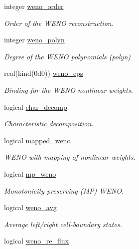 \begin{DoxyCompactItemize}
integer \hyperlink{namespacem__global__parameters_ab8488205257dab4e94258eee55d0d1aa}{weno\+\_\+order}
\begin{DoxyCompactList}\small\item\em Order of the W\+E\+NO reconstruction. \end{DoxyCompactList}\item 
integer \hyperlink{namespacem__global__parameters_a351be005cfac23e82310e91393f5d535}{weno\+\_\+polyn}
\begin{DoxyCompactList}\small\item\em Degree of the W\+E\+NO polynomials (polyn) \end{DoxyCompactList}\item 
real(kind(0d0)) \hyperlink{namespacem__global__parameters_aa25252e327df938260ddd7cc5e0a5dda}{weno\+\_\+eps}
\begin{DoxyCompactList}\small\item\em Binding for the W\+E\+NO nonlinear weights. \end{DoxyCompactList}\item 
logical \hyperlink{namespacem__global__parameters_ab62b8c589dcddff0e6295f4956012c7a}{char\+\_\+decomp}
\begin{DoxyCompactList}\small\item\em Characteristic decomposition. \end{DoxyCompactList}\item 
logical \hyperlink{namespacem__global__parameters_af2a0f6c4c9454f92703fb3bc96b4e799}{mapped\+\_\+weno}
\begin{DoxyCompactList}\small\item\em W\+E\+NO with mapping of nonlinear weights. \end{DoxyCompactList}\item 
logical \hyperlink{namespacem__global__parameters_a9106f4f1ad8f317bafc9c8934297752d}{mp\+\_\+weno}
\begin{DoxyCompactList}\small\item\em Monotonicity preserving (MP) W\+E\+NO. \end{DoxyCompactList}\item 
logical \hyperlink{namespacem__global__parameters_a1b38593c502f05d17607529d38c97a82}{weno\+\_\+avg}
\begin{DoxyCompactList}\small\item\em Average left/right cell-\/boundary states. \end{DoxyCompactList}\item 
logical \hyperlink{namespacem__global__parameters_a3c3cd38abc3ece085bab77788afece73}{weno\+\_\+re\+\_\+flux}

\end{DoxyCompactItemize}
